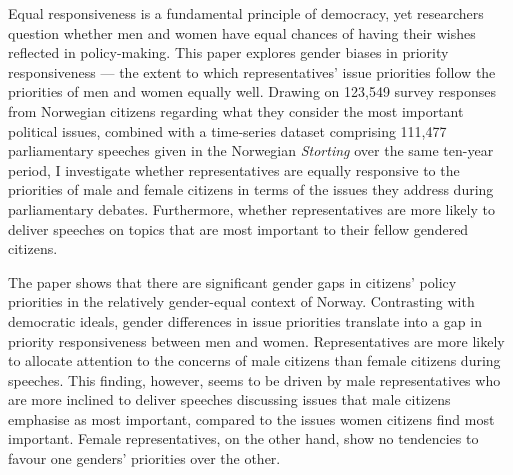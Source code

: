 Equal responsiveness is a fundamental principle of democracy, yet researchers question whether men and women have equal chances of having their wishes reflected in policy-making. This paper explores gender biases in priority responsiveness — the extent to which representatives' issue priorities follow the priorities of men and women equally well. Drawing on 123,549 survey responses from Norwegian citizens regarding what they consider the most important political issues, combined with a time-series dataset comprising 111,477 parliamentary speeches given in the Norwegian \textit{Storting} over the same ten-year period, I investigate whether representatives are equally responsive to the priorities of male and female citizens in terms of the issues they address during parliamentary debates. Furthermore, whether representatives are more likely to deliver speeches on topics that are most important to their fellow gendered citizens.

The paper shows that there are significant gender gaps in citizens' policy priorities in the relatively gender-equal context of Norway. Contrasting with democratic ideals, gender differences in issue priorities translate into a gap in priority responsiveness between men and women. Representatives are more likely to allocate attention to the concerns of male citizens than female citizens during speeches. This finding, however, seems to be driven by male representatives who are more inclined to deliver speeches discussing issues that male citizens emphasise as most important, compared to the issues women citizens find most important. Female representatives, on the other hand, show no tendencies to favour one genders' priorities over the other. 